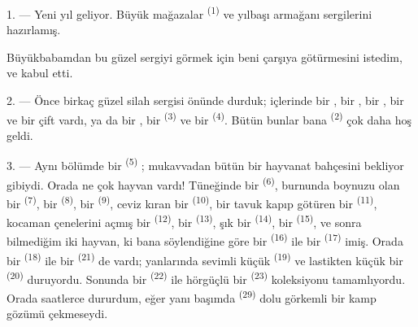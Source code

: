 %
%

\VUsaut{4.0mm}
\VUsaut{2.0mm}
\VUsaut{3.4mm}

1. --- Yeni yıl geliyor. Büyük mağazalar 
\textsuperscript{(1)} ve yılbaşı armağanı sergilerini hazırlamış.

Büyükbabamdan bu güzel sergiyi görmek için beni çarşıya götürmesini istedim,
ve kabul etti.

2. --- Önce birkaç güzel silah sergisi önünde durduk; içlerinde bir
, bir , bir , bir
 ve bir çift  vardı, ya da bir
, bir  \textsuperscript{(3)} ve bir
 \textsuperscript{(4)}. Bütün bunlar bana  \textsuperscript{(2)} çok daha hoş geldi.

\VUsaut{3.0mm}
\VUsaut{2.6mm}

3. --- Aynı bölümde bir  \textsuperscript{(5)}
; mukavvadan bütün bir hayvanat bahçesini
bekliyor gibiydi. Orada ne çok hayvan vardı! Tüneğinde bir 
\textsuperscript{(6)}, burnunda boynuzu olan bir 
\textsuperscript{(7)}, bir  \textsuperscript{(8)}, bir
 \textsuperscript{(9)}, ceviz kıran bir 
\textsuperscript{(10)}, bir tavuk kapıp götüren bir 
\textsuperscript{(11)}, kocaman çenelerini açmış bir 
\textsuperscript{(12)}, bir  \textsuperscript{(13)}, şık bir
 \textsuperscript{(14)}, bir 
\textsuperscript{(15)}, ve sonra bilmediğim iki hayvan, ki bana söylendiğine
göre bir  \textsuperscript{(16)} ile bir 
\textsuperscript{(17)} imiş. Orada bir  \textsuperscript{(18)} ile
bir  \textsuperscript{(21)} de vardı; yanlarında sevimli küçük
 \textsuperscript{(19)} ve lastikten küçük bir  \textsuperscript{(20)} duruyordu. Sonunda bir 
\textsuperscript{(22)} ile hörgüçlü bir  \textsuperscript{(23)}
koleksiyonu tamamlıyordu. Orada saatlerce dururdum, eğer yanı başımda
 \textsuperscript{(29)} dolu görkemli bir kamp gözümü
çekmeseydi.

